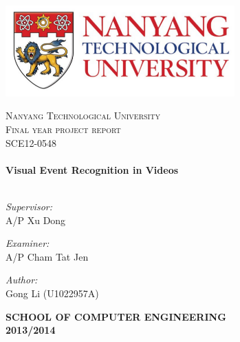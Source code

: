 
\begin{titlepage}
\begin{center}

\includegraphics[width = 0.66\textwidth]{ntu_logo}

\textsc{\LARGE Nanyang Technological University}\\[1.5cm]

\textsc{\Large Final year project report}\\[1.2cm]
\textsc{\Large SCE12-0548}\\[1cm]

\HRule \\[0.4cm]
{ \huge \bfseries Visual Event Recognition in Videos \\[0.4cm] }
\HRule \\[1.2cm]


\begin{minipage}{0.4\textwidth}
\begin{flushleft} \large
\emph{Supervisor:} \\
A/P Xu Dong
\end{flushleft}
\end{minipage}

\vfill
\begin{minipage}{0.4\textwidth}
\begin{flushleft} \large
\emph{Examiner:} \\
A/P Cham Tat Jen\\
\end{flushleft}
\end{minipage}
\vfill

\begin{minipage}{0.4\textwidth}
\begin{flushleft} \large
\emph{Author:}\\
Gong Li (U1022957A)
\end{flushleft}
\end{minipage}

\vfill

\textsc{\bfseries SCHOOL OF COMPUTER ENGINEERING}
\\
\textbf{2013/2014}

\end{center}
\end{titlepage}